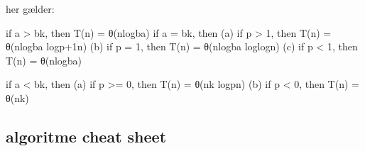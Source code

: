 \documentclass[letterpaper,10pt,danish]{sphinxmanual}
\begin{document}
\sphinxAtStartPar
her gælder:

\sphinxAtStartPar
if a \textgreater{} bk, then T(n) = θ(nlogba)
if a = bk, then
(a) if p \textgreater{} \sphinxhyphen{}1, then T(n) = θ(nlogba logp+1n)
(b) if p = \sphinxhyphen{}1, then T(n) = θ(nlogba loglogn)
(c) if p \textless{} \sphinxhyphen{}1, then T(n) = θ(nlogba)

\sphinxAtStartPar
if a \textless{} bk, then
(a) if p \textgreater{}= 0, then T(n) = θ(nk logpn)
(b) if p \textless{} 0, then T(n) = θ(nk)


\subsection{algoritme cheat sheet}
\label{\detokenize{Algorithmer/Kompleksitet:algoritme-cheat-sheet}}
\end{document}
